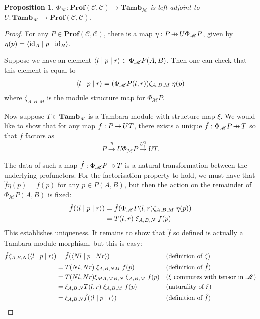 \documentclass[11pt,letterpaper]{article}
\theoremstyle{plain}
\newtheorem{proposition}[theorem]{Proposition}
\theoremstyle{definition}
\newcommand{\C}{\mathscr{C}}
\newcommand{\M}{\mathscr{M}}
\newcommand{\Pastro}{\Phi}
\newcommand{\Prof}{\mathbf{Prof}}
\newcommand{\Tamb}{\mathbf{Tamb}}
\newcommand{\id}{\mathrm{id}}
\newcommand{\repthree}[3]{{\ensuremath \langle #1 \mid #2 \mid #3 \rangle}}
\newcommand{\hto}{\ensuremath{\,\mathaccent\shortmid\rightarrow\,}}
\begin{document}
\begin{proposition}
  $\Pastro_\M : \Prof(\C, \C) \to \Tamb_\M$ is left adjoint to $U : \Tamb_\M \to \Prof(\C, \C)$.
\end{proposition}
\begin{proof}
  For any $P \in \Prof(\C, \C)$, there is a map $\eta : P \hto U \Pastro_\M P$, given by $\eta(p) = \repthree{\id_A}{p}{\id_B}$.

  Suppose we have an element $\repthree{l}{p}{r} \in \Pastro_\M P(A,B)$. Then one can check that this element is equal to
  \begin{align*}
    \repthree{l}{p}{r} = (\Pastro_\M P(l, r)) \zeta_{A, B, M} \; \eta(p)
  \end{align*}
  where $\zeta_{A, B, M}$ is the module structure map for $\Pastro_\M P$.

  Now suppose $T \in \Tamb_\M$ is a Tambara module with structure map $\xi$. We would like to show that for any map $f : P \hto UT$, there exists a unique $\hat f : \Pastro_\M P \hto T$ so that $f$ factors as \[P \xrightarrow{\eta} U \Pastro_\M P \xrightarrow{U\hat f} UT. \]

  The data of such a map $\hat f : \Pastro_\M P \hto T$ is a natural transformation between the underlying profunctors. For the factorisation property to hold, we must have that $\hat{f}\eta(p) = f(p)$ for any $p \in P(A,B)$, but then the action on the remainder of $\Pastro_\M P(A, B)$ is fixed:
  \begin{align*}
    \hat{f}(\repthree{l}{p}{r}) 
    &= \hat{f}(\Pastro_\M P(l, r) \zeta_{A, B, M} \; \eta(p)) \\
    &=T(l, r) \; \xi_{A, B, N} \; f(p)
  \end{align*}
  This establishes uniqueness. It remains to show that $\hat{f}$ so defined is actually a Tambara module morphism, but this is easy:
  \begin{align*}
    \hat{f}\zeta_{A,B,N}(\repthree{l}{p}{r})
    &= \hat{f}(\repthree{Nl}{p}{Nr}) && \text{(definition of $\zeta$)}\\
    &= T(Nl, Nr) \; \xi_{A, B, NM} \; f(p) && \text{(definition of $\hat{f}$)}\\
    &= T(Nl, Nr) \xi_{MA,MB,N} \; \xi_{A, B, M} \; f(p) && \text{($\xi$ commutes with tensor in $\M$)} \\
    &= \xi_{A,B,N} T(l, r) \; \xi_{A, B, M} \; f(p) && \text{(naturality of $\xi$)} \\
    &= \xi_{A,B,N} \hat{f} (\repthree{l}{p}{r}) && \text{(definition of $\hat{f}$)}
  \end{align*}
\end{proof}
\end{document}
